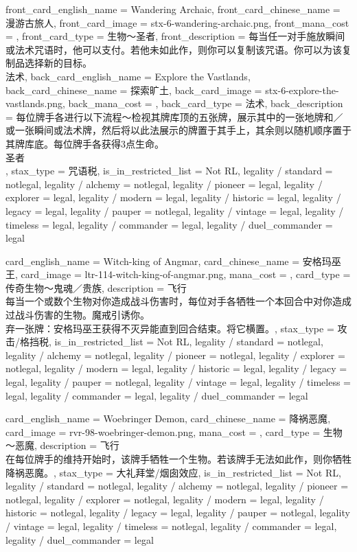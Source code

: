 \documentclass[lang = cn, color = black, 10pt]{AllThatStax}
\begin{document}
\mfcard
{
	front_card_english_name = {Wandering Archaic},
	front_card_chinese_name = {漫游古旅人},
	front_card_image = stx-6-wandering-archaic.png,
	front_mana_cost = ,
	front_card_type = 生物～圣者,
	front_description = {每当任一对手施放瞬间或法术咒语时，他可以支付。若他未如此作，则你可以复制该咒语。你可以为该复制品选择新的目标。\\
法术},
	back_card_english_name = {Explore the Vastlands},
	back_card_chinese_name = {探索旷土},
	back_card_image = stx-6-explore-the-vastlands.png,
	back_mana_cost = ,
	back_card_type = 法术,
	back_description = {每位牌手各进行以下流程～检视其牌库顶的五张牌，展示其中的一张地牌和／或一张瞬间或法术牌，然后将以此法展示的牌置于其手上，其余则以随机顺序置于其牌库底。每位牌手各获得3点生命。\\
圣者\\
},
	stax_type = 咒语税,
	is_in_restricted_list = Not RL,
	legality / standard = notlegal,
	legality / alchemy = notlegal,
	legality / pioneer = legal,
	legality / explorer = legal,
	legality / modern = legal,
	legality / historic = legal,
	legality / legacy = legal,
	legality / pauper = notlegal,
	legality / vintage = legal,
	legality / timeless = legal,
	legality / commander = legal,
	legality / duel_commander = legal
}

\card
{
	card_english_name = {Witch-king of Angmar},
	card_chinese_name = {安格玛巫王},
	card_image = ltr-114-witch-king-of-angmar.png,
	mana_cost = ,
	card_type = 传奇生物～鬼魂／贵族,
	description = {飞行\\
每当一个或数个生物对你造成战斗伤害时，每位对手各牺牲一个本回合中对你造成过战斗伤害的生物。魔戒引诱你。\\
弃一张牌：安格玛巫王获得不灭异能直到回合结束。将它横置。},
	stax_type = 攻击/格挡税,
	is_in_restricted_list = Not RL,
	legality / standard = notlegal,
	legality / alchemy = notlegal,
	legality / pioneer = notlegal,
	legality / explorer = notlegal,
	legality / modern = legal,
	legality / historic = legal,
	legality / legacy = legal,
	legality / pauper = notlegal,
	legality / vintage = legal,
	legality / timeless = legal,
	legality / commander = legal,
	legality / duel_commander = legal
}

\card
{
	card_english_name = {Woebringer Demon},
	card_chinese_name = {降祸恶魔},
	card_image = rvr-98-woebringer-demon.png,
	mana_cost = ,
	card_type = 生物～恶魔,
	description = {飞行\\
在每位牌手的维持开始时，该牌手牺牲一个生物。若该牌手无法如此作，则你牺牲降祸恶魔。},
	stax_type = 大礼拜堂/烟囱效应,
	is_in_restricted_list = Not RL,
	legality / standard = notlegal,
	legality / alchemy = notlegal,
	legality / pioneer = notlegal,
	legality / explorer = notlegal,
	legality / modern = legal,
	legality / historic = notlegal,
	legality / legacy = legal,
	legality / pauper = notlegal,
	legality / vintage = legal,
	legality / timeless = notlegal,
	legality / commander = legal,
	legality / duel_commander = legal
}
\end{document}
